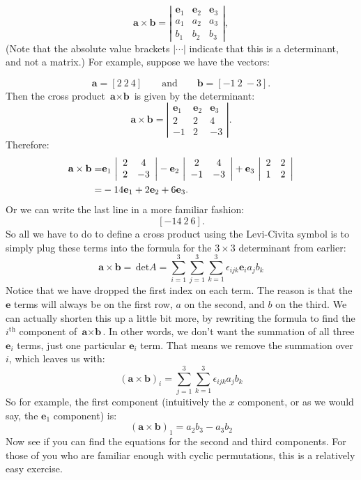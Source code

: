 \[ \textbf{a} \times \textbf{b}=
 \left| \begin{array}{ccc}
\textbf{e}_1 & \textbf{e}_2  & \textbf{e}_3  \\
a_1 & a_2 & a_3 \\
b_1 & b_2 & b_3 \end{array} \right|,\]
(Note that the absolute value brackets $\left|\cdots\right|$ indicate that this is a determinant, and not a matrix.)
For example, suppose we have the vectors:

\[ \textbf{a}= [2~ 2~ 4] \qquad \text{and} \qquad \textbf{b}=[-1~2~-3]. \]
Then the cross product $\textbf{a} \times \textbf{b}$ is given by the determinant:
\[ \textbf{a} \times \textbf{b} =
 \left| \begin{array}{ccc}
\textbf{e}_1 & \textbf{e}_2  & \textbf{e}_3  \\
2 & 2 & 4\\
-1 & 2 & -3 \end{array} \right|.\] 
Therefore:
\begin{align}
\textbf{a} \times \textbf{b} =& \textbf{e}_1 \,
 \left| \begin{array}{cc}
2 & 4 \\
2 & -3  \end{array} \right| - \textbf{e}_2 \,
 \left| \begin{array}{cc}
2 & 4 \\
-1 & -3  \end{array} \right| + \textbf{e}_3 \,
 \left| \begin{array}{cc}
2 & 2 \\
1 & 2  \end{array} \right| \notag\\
=& -14 \textbf{e}_1 + 2 \textbf{e}_2 + 6 \textbf{e}_3.
\end{align}
Or we can write the last line in a more familiar fashion:
\[ [-14 ~ 2 ~ 6]. \] 
So all we have to do to define a cross product using the Levi-Civita symbol is to simply plug these terms into the formula for the $3 \times 3$ determinant from earlier:
\[\textbf{a} \times \textbf{b} = \,\text{det} A = \sum_{i=1}^3 \sum_{j=1}^3 \sum_{k=1}^3 \epsilon_{ijk} \textbf{e}_i  a_j b_k \]
Notice that we have dropped the first index on each term.  The reason is that the $\textbf{e}$ terms will always be on the first row, $a$ on the second, and $b$ on the third.  
We can actually shorten this up a little bit more, by rewriting the formula to find the $i^{\text{th}}$ component of $\textbf{a} \times \textbf{b}$.  In other words, we don't want the summation of all three $\textbf{e}_i$ terms, just one particular $\textbf{e}_i$ term.  That means we remove the summation over $i$, which leaves us with:
\[ (\textbf{a} \times \textbf{b})_i = \sum_{j=1}^3 \sum_{k=1}^3 \epsilon_{ijk} a_j b_k \]
So for example, the first component (intuitively the $x$ component, or as we would say, the $\textbf{e}_1$ component) is:
\[ (\textbf{a} \times \textbf{b})_1 = a_2 b_3 - a_3 b_2 \]
Now see if you can find the equations for the second and third components.  For those of you who are familiar enough with cyclic permutations, this is a relatively easy exercise.  

